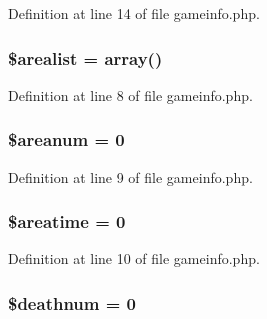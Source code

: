 Definition at line 14 of file gameinfo.\+php.

\hypertarget{install_2gameinfo_8php_a692d2363b048bb3fcdb65bf6bde8d9e6}{
\subsubsection[{\$arealist}]{\setlength{\rightskip}{0pt plus 5cm}\$arealist = array()}}\label{install_2gameinfo_8php_a692d2363b048bb3fcdb65bf6bde8d9e6}


Definition at line 8 of file gameinfo.\+php.

\hypertarget{install_2gameinfo_8php_a23e1b0df49f9669284a6b829a473a53c}{
\subsubsection[{\$areanum}]{\setlength{\rightskip}{0pt plus 5cm}\$areanum = 0}}\label{install_2gameinfo_8php_a23e1b0df49f9669284a6b829a473a53c}


Definition at line 9 of file gameinfo.\+php.

\hypertarget{install_2gameinfo_8php_a09c35ae4cf3040a5cd4d20a69f894015}{
\subsubsection[{\$areatime}]{\setlength{\rightskip}{0pt plus 5cm}\$areatime = 0}}\label{install_2gameinfo_8php_a09c35ae4cf3040a5cd4d20a69f894015}


Definition at line 10 of file gameinfo.\+php.

\hypertarget{install_2gameinfo_8php_ac8cccc0e21ebd6828150700b1436a5f8}{
\subsubsection[{\$deathnum}]{\setlength{\rightskip}{0pt plus 5cm}\$deathnum = 0}}\label{install_2gameinfo_8php_ac8cccc0e21ebd6828150700b1436a5f8}


